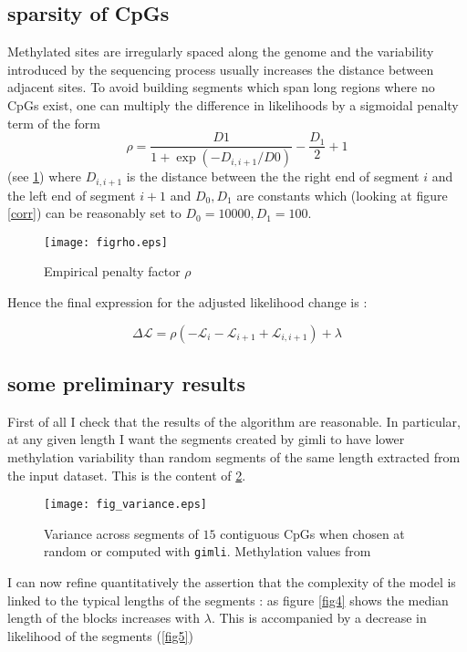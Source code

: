 \documentclass[12pt]{amsart}
\newcommand{\lik}{\ensuremath{\mathcal{L}}}
\newcommand{\gimli}{\texttt{gimli}}
\begin{document}
\subsection{sparsity of CpGs}

Methylated sites are irregularly spaced along the genome and the variability 
introduced by the sequencing process usually increases the distance 
between adjacent sites.
To avoid building segments which span long regions where no CpGs exist, one 
can multiply the difference in likelihoods by a sigmoidal penalty term of the
form \[\rho=\frac{D1}{1+\exp(-D_{i,i+1}/D0)}-\frac{D_1}{2}+1\] (see \ref{figrho}) 
where $D_{i,i+1}$ is the distance 
between the the right end of segment $i$ and the left end of segment $i+1$ and 
$D_0,D_1$ are constants which (looking at figure \ref{corr}) can be reasonably 
set to $D_0=10000,D_1=100$. 

\begin{figure}\label{figrho}
\texttt{[image: figrho.eps]}
\caption{Empirical penalty factor $\rho$}
\end{figure}

Hence the final expression for the adjusted likelihood change is :

\begin{equation}
\Delta \lik = \rho ( -\mathcal{L}_i-\mathcal{L}_{i+1}+\mathcal{L}_{i,i+1} )  +\lambda
\end{equation}


\subsection{some preliminary results}

First of all I check that the results of the algorithm are reasonable.
In particular, at any given length I want the segments created by gimli to have lower methylation
variability than random segments of the same length extracted from the input dataset. This is the content of
\ref{fig3}.

\begin{figure}\label{fig3}
\texttt{[image: fig\_variance.eps]}
\caption{Variance across segments of $15$ contiguous CpGs when chosen at random or 
computed with \gimli{}. Methylation values from }
\end{figure}

I can now refine quantitatively the assertion that the complexity of the model
is linked to the typical lengths of the segments : as figure \ref{fig4} 
shows the median length of the blocks increases with $\lambda$. This is 
accompanied by a decrease in likelihood of the segments (\ref{fig5})
\end{document}
